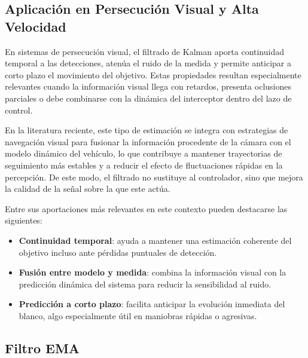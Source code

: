 \vspace{0.4cm}

\subsection{Aplicación en Persecución Visual y Alta Velocidad}

\vspace{0.4cm}

En sistemas de persecución visual, el filtrado de Kalman aporta continuidad temporal a las detecciones, atenúa el ruido de la medida y permite anticipar a corto plazo el movimiento del objetivo. Estas propiedades resultan especialmente relevantes cuando la información visual llega con retardos, presenta oclusiones parciales o debe combinarse con la dinámica del interceptor dentro del lazo de control.

\vspace{0.4cm}

En la literatura reciente, este tipo de estimación se integra con estrategias de navegación visual para fusionar la información procedente de la cámara con el modelo dinámico del vehículo, lo que contribuye a mantener trayectorias de seguimiento más estables y a reducir el efecto de fluctuaciones rápidas en la percepción. De este modo, el filtrado no sustituye al controlador, sino que mejora la calidad de la señal sobre la que este actúa.

\vspace{0.4cm}

Entre sus aportaciones más relevantes en este contexto pueden destacarse las siguientes:

\begin{itemize}
    \item \textbf{Continuidad temporal}: ayuda a mantener una estimación coherente del objetivo incluso ante pérdidas puntuales de detección.
    \item \textbf{Fusión entre modelo y medida}: combina la información visual con la predicción dinámica del sistema para reducir la sensibilidad al ruido.
    \item \textbf{Predicción a corto plazo}: facilita anticipar la evolución inmediata del blanco, algo especialmente útil en maniobras rápidas o agresivas.
\end{itemize}

\vspace{0.3cm}
\subsection{Filtro EMA}


